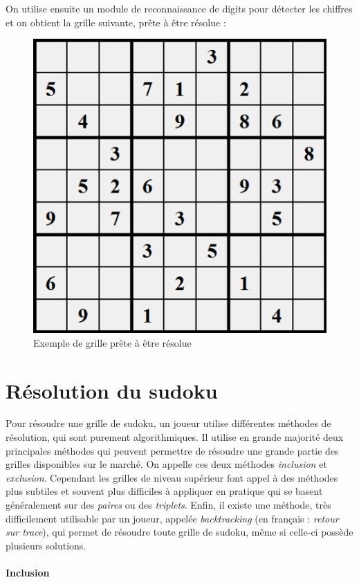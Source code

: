 \documentclass[12pt,a4paper]{report}
\begin{document}
On utilise ensuite un module de reconnaissance de digits pour détecter les chiffres et on obtient la grille suivante, prête à être résolue :

\begin{figure}[!h]
 \center
 \includegraphics[scale=0.45]{../pictures/finished.png}
 \caption{Exemple de grille prête à être résolue}
\end{figure}
\newpage

\section{Résolution du sudoku}
\label{Resolution}
Pour résoudre une grille de sudoku, un joueur utilise différentes méthodes de résolution, qui sont purement algorithmiques. Il utilise en grande majorité deux principales méthodes qui peuvent permettre de résoudre une grande partie des grilles disponibles sur le marché. On appelle ces deux méthodes \emph{inclusion} et \emph{exclusion}. Cependant les grilles de niveau supérieur font appel à des méthodes plus subtiles et souvent plus difficiles à appliquer en pratique qui se basent généralement sur des \emph{paires} ou des \emph{triplets}. Enfin, il existe une méthode, très difficilement utilisable par un joueur, appelée \emph{backtracking} (en français : \emph{retour sur trace}), qui permet de résoudre toute grille de sudoku, même si celle-ci possède plusieurs solutions.
\paragraph{Inclusion}
\end{document}
